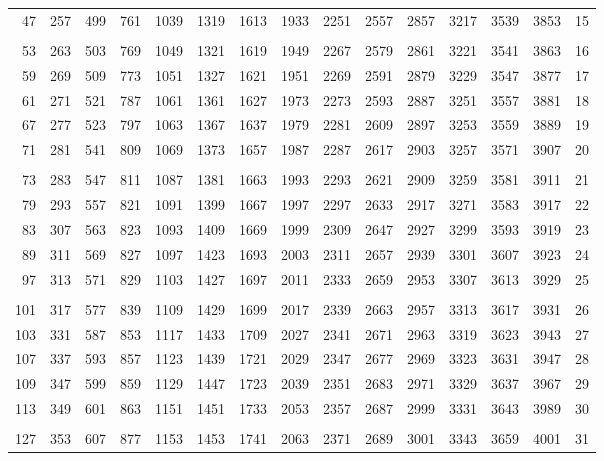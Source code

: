 \begin{tabular}{|r|r|r|r|r|r|r|r|r|r|r|r|r|r||r|}
  47 &  257 &  499 &  761 & 1039 & 1319 & 1613 & 1933 & 2251 & 2557 & 2857 & 3217 & 3539 & 3853 &   15\\
&&&&&&&&&&&&&&\\
  53 &  263 &  503 &  769 & 1049 & 1321 & 1619 & 1949 & 2267 & 2579 & 2861 & 3221 & 3541 & 3863 &   16\\
  59 &  269 &  509 &  773 & 1051 & 1327 & 1621 & 1951 & 2269 & 2591 & 2879 & 3229 & 3547 & 3877 &   17\\
  61 &  271 &  521 &  787 & 1061 & 1361 & 1627 & 1973 & 2273 & 2593 & 2887 & 3251 & 3557 & 3881 &   18\\
  67 &  277 &  523 &  797 & 1063 & 1367 & 1637 & 1979 & 2281 & 2609 & 2897 & 3253 & 3559 & 3889 &   19\\
  71 &  281 &  541 &  809 & 1069 & 1373 & 1657 & 1987 & 2287 & 2617 & 2903 & 3257 & 3571 & 3907 &   20\\
&&&&&&&&&&&&&&\\
  73 &  283 &  547 &  811 & 1087 & 1381 & 1663 & 1993 & 2293 & 2621 & 2909 & 3259 & 3581 & 3911 &   21\\
  79 &  293 &  557 &  821 & 1091 & 1399 & 1667 & 1997 & 2297 & 2633 & 2917 & 3271 & 3583 & 3917 &   22\\
  83 &  307 &  563 &  823 & 1093 & 1409 & 1669 & 1999 & 2309 & 2647 & 2927 & 3299 & 3593 & 3919 &   23\\
  89 &  311 &  569 &  827 & 1097 & 1423 & 1693 & 2003 & 2311 & 2657 & 2939 & 3301 & 3607 & 3923 &   24\\
  97 &  313 &  571 &  829 & 1103 & 1427 & 1697 & 2011 & 2333 & 2659 & 2953 & 3307 & 3613 & 3929 &   25\\
&&&&&&&&&&&&&&\\
 101 &  317 &  577 &  839 & 1109 & 1429 & 1699 & 2017 & 2339 & 2663 & 2957 & 3313 & 3617 & 3931 &   26\\
 103 &  331 &  587 &  853 & 1117 & 1433 & 1709 & 2027 & 2341 & 2671 & 2963 & 3319 & 3623 & 3943 &   27\\
 107 &  337 &  593 &  857 & 1123 & 1439 & 1721 & 2029 & 2347 & 2677 & 2969 & 3323 & 3631 & 3947 &   28\\
 109 &  347 &  599 &  859 & 1129 & 1447 & 1723 & 2039 & 2351 & 2683 & 2971 & 3329 & 3637 & 3967 &   29\\
 113 &  349 &  601 &  863 & 1151 & 1451 & 1733 & 2053 & 2357 & 2687 & 2999 & 3331 & 3643 & 3989 &   30\\
&&&&&&&&&&&&&&\\
 127 &  353 &  607 &  877 & 1153 & 1453 & 1741 & 2063 & 2371 & 2689 & 3001 & 3343 & 3659 & 4001 &   31\\

\end{tabular}
